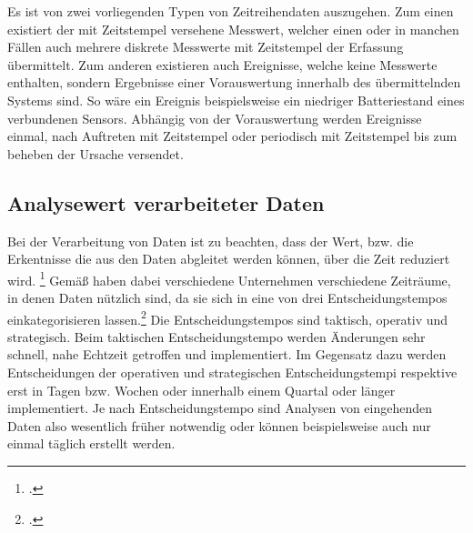 Es ist von zwei vorliegenden Typen von Zeitreihendaten auszugehen. Zum einen existiert der mit Zeitstempel versehene Messwert, welcher einen oder in manchen Fällen auch mehrere diskrete Messwerte mit Zeitstempel der Erfassung übermittelt. 
Zum anderen existieren auch Ereignisse, welche keine Messwerte enthalten, sondern Ergebnisse einer Vorauswertung innerhalb des übermittelnden Systems sind. 
So wäre ein Ereignis beispielsweise ein niedriger Batteriestand eines verbundenen Sensors. 
Abhängig von der Vorauswertung werden Ereignisse einmal, nach Auftreten mit Zeitstempel oder periodisch mit Zeitstempel bis zum beheben der Ursache versendet. 

\subsection{Analysewert verarbeiteter Daten}

Bei der Verarbeitung von Daten ist zu beachten, dass der Wert, bzw. die Erkentnisse die aus den Daten abgleitet werden können, über die Zeit reduziert wird. \footcite[Vgl. auch im Folgenden][]{NucleusResarchInc..2012} Gemäß \citeauthor{NucleusResarchInc..2012} haben dabei verschiedene Unternehmen verschiedene Zeiträume, in denen Daten nützlich sind, da sie sich in eine von drei Entscheidungstempos einkategorisieren lassen.\footcite[Vgl. auch im Folgenden][3]{NucleusResarchInc..2012} Die Entscheidungstempos sind taktisch, operativ und strategisch. Beim taktischen Entscheidungstempo werden Änderungen sehr schnell, nahe Echtzeit getroffen und implementiert. Im Gegensatz dazu werden Entscheidungen der operativen und strategischen Entscheidungstempi respektive erst in Tagen bzw. Wochen oder innerhalb einem Quartal oder länger implementiert. Je nach Entscheidungstempo sind Analysen von eingehenden Daten also wesentlich früher notwendig oder können beispielsweise auch nur einmal täglich erstellt werden.




